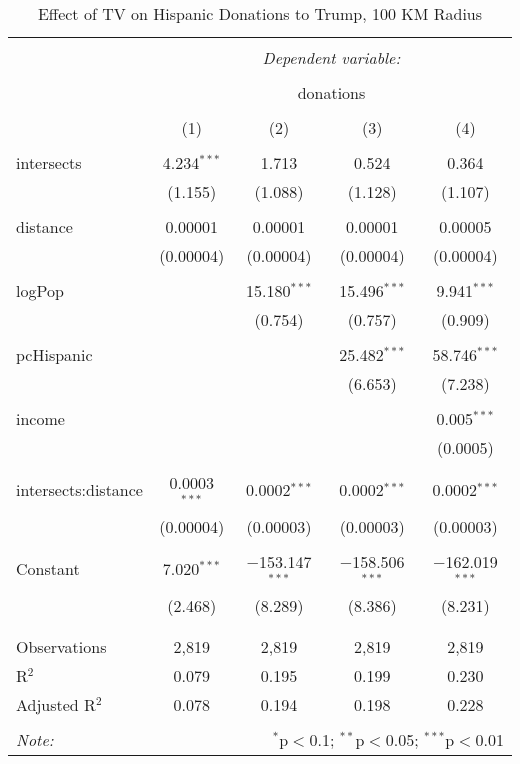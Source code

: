 
\begin{table}[!htbp] \centering 
  \caption{Effect of TV on Hispanic Donations to Trump, 100 KM Radius} 
  \label{} 
\begin{tabular}{@{\extracolsep{-5pt}}lcccc} 
\\[-1.8ex]\hline 
\hline \\[-1.8ex] 
 & \multicolumn{4}{c}{\textit{Dependent variable:}} \\ 
\cline{2-5} 
\\[-1.8ex] & \multicolumn{4}{c}{donations} \\ 
\\[-1.8ex] & (1) & (2) & (3) & (4)\\ 
\hline \\[-1.8ex] 
 intersects & 4.234$^{***}$ & 1.713 & 0.524 & 0.364 \\ 
  & (1.155) & (1.088) & (1.128) & (1.107) \\ 
  & & & & \\ 
 distance & 0.00001 & 0.00001 & 0.00001 & 0.00005 \\ 
  & (0.00004) & (0.00004) & (0.00004) & (0.00004) \\ 
  & & & & \\ 
 logPop &  & 15.180$^{***}$ & 15.496$^{***}$ & 9.941$^{***}$ \\ 
  &  & (0.754) & (0.757) & (0.909) \\ 
  & & & & \\ 
 pcHispanic &  &  & 25.482$^{***}$ & 58.746$^{***}$ \\ 
  &  &  & (6.653) & (7.238) \\ 
  & & & & \\ 
 income &  &  &  & 0.005$^{***}$ \\ 
  &  &  &  & (0.0005) \\ 
  & & & & \\ 
 intersects:distance & 0.0003$^{***}$ & 0.0002$^{***}$ & 0.0002$^{***}$ & 0.0002$^{***}$ \\ 
  & (0.00004) & (0.00003) & (0.00003) & (0.00003) \\ 
  & & & & \\ 
 Constant & 7.020$^{***}$ & $-$153.147$^{***}$ & $-$158.506$^{***}$ & $-$162.019$^{***}$ \\ 
  & (2.468) & (8.289) & (8.386) & (8.231) \\ 
  & & & & \\ 
\hline \\[-1.8ex] 
Observations & 2,819 & 2,819 & 2,819 & 2,819 \\ 
R$^{2}$ & 0.079 & 0.195 & 0.199 & 0.230 \\ 
Adjusted R$^{2}$ & 0.078 & 0.194 & 0.198 & 0.228 \\ 
\hline 
\hline \\[-1.8ex] 
\textit{Note:}  & \multicolumn{4}{r}{$^{*}$p$<$0.1; $^{**}$p$<$0.05; $^{***}$p$<$0.01} \\ 
\end{tabular} 
\end{table} 
